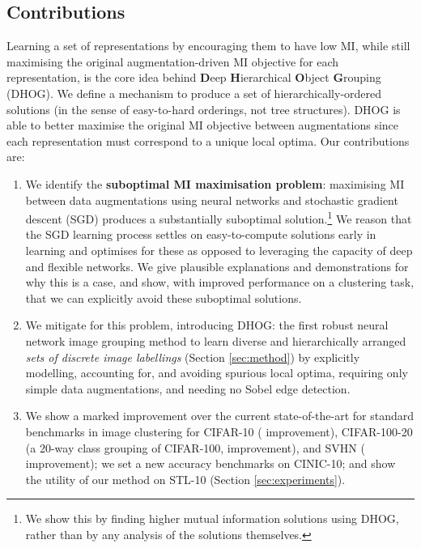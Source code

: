 \documentclass[runningheads]{llncs}
\begin{document}
\subsection{Contributions}

Learning a set of representations by encouraging them to have low MI, while still maximising the original augmentation-driven MI objective for each representation, is the core idea behind \textbf{D}eep \textbf{H}ierarchical \textbf{O}bject \textbf{G}rouping (DHOG). We define a mechanism to produce a set of hierarchically-ordered solutions (in the sense of easy-to-hard orderings, not tree structures). DHOG is able to better maximise the original MI objective between augmentations since each representation must correspond to a unique local optima. Our contributions are:





\begin{enumerate}
\item We identify the \textbf{suboptimal MI maximisation problem}: maximising MI between data augmentations using neural networks and stochastic gradient descent (SGD) produces a substantially suboptimal solution.\footnote{We show this by finding higher mutual information solutions using DHOG, rather than by any analysis of the solutions themselves.} We reason that the SGD learning process settles on easy-to-compute solutions early in learning and optimises for these as opposed to leveraging the capacity of deep and flexible networks. We give plausible explanations and demonstrations for why this is a case, and show, with improved performance on a clustering task, that we can explicitly avoid these suboptimal solutions. 
\item We mitigate for this problem, introducing DHOG: the first robust neural network image grouping method to learn diverse and hierarchically arranged \textit{sets of discrete image labellings} (Section \ref{sec:method}) by explicitly modelling, accounting for, and avoiding spurious local optima, requiring only simple data augmentations, and needing no Sobel edge detection.
\item We show a marked improvement over the current state-of-the-art for standard benchmarks in image clustering for CIFAR-10 ( improvement), CIFAR-100-20 (a 20-way class grouping of CIFAR-100,  improvement), and SVHN ( improvement); we set a new accuracy benchmarks on CINIC-10; and show the utility of our method on STL-10 (Section \ref{sec:experiments}).
\end{enumerate}
\end{document}
